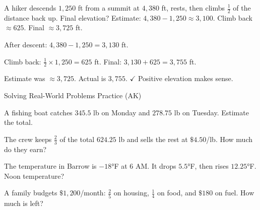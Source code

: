 \begin{stepExample}{A hiker descends $1{,}250$ ft from a summit at $4{,}380$ ft, rests, then climbs $\frac{1}{2}$ of the distance back up. Final elevation?}
     Estimate: $4{,}380 - 1{,}250 \approx 3{,}100$. Climb back $\approx 625$. Final $\approx 3{,}725$ ft.

     After descent: $4{,}380 - 1{,}250 = 3{,}130$ ft.\par
    Climb back: $\frac{1}{2} \times 1{,}250 = 625$ ft. Final: $3{,}130 + 625 = 3{,}755$ ft.

     Estimate was $\approx 3{,}725$. Actual is $3{,}755$. $\checkmark$ Positive elevation makes sense.
\end{stepExample}


\newpage
\begin{stepPractice}{Solving Real-World Problems Practice (AK)}
    \resetProblems

    \prob A fishing boat catches $345.5$ lb on Monday and $278.75$ lb on Tuesday. Estimate the total. \answerBlank[2.5cm]

    \prob The crew keeps $\frac{2}{3}$ of the total $624.25$ lb and sells the rest at $\$4.50$/lb. How much do they earn? \answerBlank[2.5cm]

    \prob The temperature in Barrow is $-18°$F at $6$ AM. It drops $5.5°$F, then rises $12.25°$F. Noon temperature? \answerBlank[2.5cm]

    \prob A family budgets $\$1{,}200$/month: $\frac{2}{5}$ on housing, $\frac{1}{4}$ on food, and $\$180$ on fuel. How much is left? \answerBlank[2.5cm]

\end{stepPractice}
